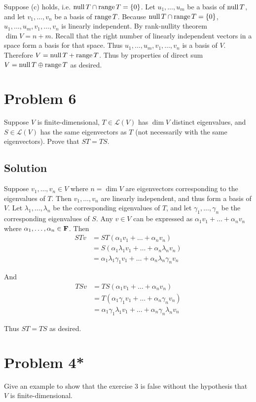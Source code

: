 \documentclass{article}
\begin{document}
\vs

Suppose (c) holds, i.e. $\text{null}\, T\cap\text{range}\, T=\{0\}$. Let $u_1,\ldots,u_m$ be a basis of $\text{null}\, T$, and let $v_1,\ldots,v_n$ be a basis of $\text{range}\, T$. Because $\text{null}\, T\cap\text{range}\, T=\{0\}$, $u_1,\ldots,u_m, v_1,\ldots,v_n$ is linearly independent. By rank-nullity theorem $\dim V=n+m$. Recall that the right number of linearly independent vectors in a space form a basis for that space. Thus $u_1,\ldots,u_m, v_1,\ldots,v_n$ is a basis of $V$. Therefore $V=\text{null}\, T + \text{range}\, T$. Thus by properties of direct sum $V=\text{null}\, T\oplus \text{range}\, T$ as desired. 

\section*{Problem 6}
Suppose $V$ is finite-dimensional, $T\in\mathcal{L}(V)$ has $\dim V$ distinct eigenvalues, and $S\in\mathcal{L}(V)$ has the same eigenvectors as $T$ (not necessarily with the same eigenvectors). Prove that $ST=TS$.

\subsection*{Solution}
Suppose $v_1,\ldots,v_n\in V$ where $n=\dim V$ are eigenvectors corresponding to the eigenvalues of $T$. Then $v_1,\ldots,v_n$ are linearly independent, and thus form a basis of $V$. Let $\lambda_1,\ldots,\lambda_n$ be the corresponding eigenvalues of $T$, and let $\gamma_1,\ldots,\gamma_n$ be the corresponding eigenvalues of $S$. Any $v\in V$ can be expressed as $\alpha_1v_1+\ldots+\alpha_n v_n$ where $\alpha_1,\ldots,\alpha_n\in\mathbf{F}$. Then
\begin{align*}
    STv&=ST(\alpha_1v_1+\ldots+\alpha_n v_n)\\
       &=S(\alpha_1\lambda_1v_1+\ldots+\alpha_n \lambda_n v_n)\\
       &=\alpha_1\lambda_1\gamma_1v_1+\ldots+\alpha_n \lambda_n \gamma_n v_n
\end{align*}

And
\begin{align*}
    TSv&=TS(\alpha_1v_1+\ldots+\alpha_n v_n)\\
       &=T(\alpha_1\gamma_1v_1+\ldots+\alpha_n \gamma_n v_n)\\
       &=\alpha_1\gamma_1\lambda_1v_1+\ldots+\alpha_n \gamma_n \lambda_n v_n
\end{align*}

Thus $ST=TS$ as desired.

\section*{Problem 4*}
Give an example to show that the exercise 3 is false without the hypothesis that $V$ is finite-dimensional.
\end{document}
